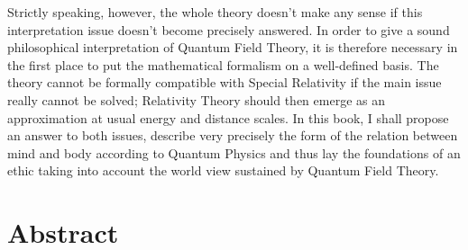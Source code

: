 Strictly speaking, however, the whole theory doesn't make any sense if this interpretation issue doesn't become precisely answered.
In order to give a sound philosophical interpretation of Quantum Field Theory, it is therefore necessary in the first place to put the mathematical formalism on a well-defined basis.
The theory cannot be formally compatible with Special Relativity if the main issue really cannot be solved; Relativity Theory should then emerge as an approximation at usual energy and distance scales.
In this book, I shall propose an answer to both issues, describe very precisely the form of the relation between mind and body according to Quantum Physics and thus lay the foundations of an ethic taking into account the world view sustained by Quantum Field Theory.


\section*{Abstract}

